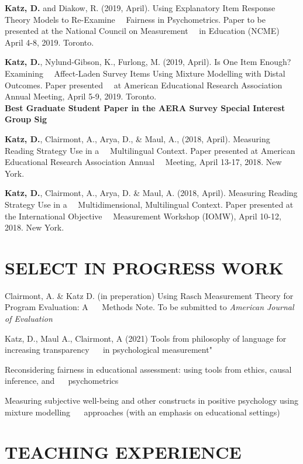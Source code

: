 \documentclass[11pt,]{article}
\begin{document}
\textbf{Katz, D.} and Diakow, R. (2019, April). Using Explanatory Item
Response Theory Models to Re-Examine ~~Fairness in Psychometrics. Paper
to be presented at the National Council on Measurement ~~in Education
(NCME) April 4-8, 2019. Toronto.

\textbf{Katz, D.}, Nylund-Gibson, K., Furlong, M. (2019, April). Is One
Item Enough? Examining ~~Affect-Laden Survey Items Using Mixture
Modelling with Distal Outcomes. Paper presented ~~at American
Educational Research Association Annual Meeting, April 5-9, 2019.
Toronto.\\
\textbf{Best Graduate Student Paper in the AERA Survey Special Interest
Group Sig}

\textbf{Katz, D.}, Clairmont, A., Arya, D., \& Maul, A., (2018, April).
Measuring Reading Strategy Use in a ~~Multilingual Context. Paper
presented at American Educational Research Association Annual ~~Meeting,
April 13-17, 2018. New York.

\textbf{Katz, D.}, Clairmont, A., Arya, D. \& Maul, A. (2018, April).
Measuring Reading Strategy Use in a ~~Multidimensional, Multilingual
Context. Paper presented at the International Objective ~~Measurement
Workshop (IOMW), April 10-12, 2018. New York.

\hypertarget{select-in-progress-work}{%
\section{SELECT IN PROGRESS WORK}\label{select-in-progress-work}}

Clairmont, A. \& Katz D. (in preperation) Using Rasch Measurement Theory
for Program Evaluation: A ~~ Methods Note. To be submitted to
\emph{American Journal of Evaluation}

Katz, D., Maul A., Clairmont, A (2021) Tools from philosophy of language
for increasing transparency ~~ in psychological measurement"

Reconsidering fairness in educational assessment: using tools from
ethics, causal inference, and ~~ psychometrics

Measuring subjective well-being and other constructs in positive
psychology using mixture modelling ~~ approaches (with an emphasis on
educational settings)

\hypertarget{teaching-experience}{%
\section{TEACHING EXPERIENCE}\label{teaching-experience}}
\end{document}
